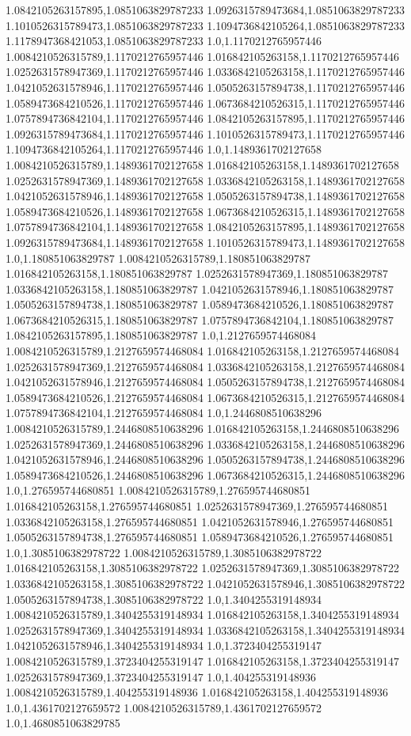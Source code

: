 1.0842105263157895,1.0851063829787233
1.0926315789473684,1.0851063829787233
1.1010526315789473,1.0851063829787233
1.1094736842105264,1.0851063829787233
1.1178947368421053,1.0851063829787233
1.0,1.1170212765957446
1.0084210526315789,1.1170212765957446
1.016842105263158,1.1170212765957446
1.0252631578947369,1.1170212765957446
1.0336842105263158,1.1170212765957446
1.0421052631578946,1.1170212765957446
1.0505263157894738,1.1170212765957446
1.0589473684210526,1.1170212765957446
1.0673684210526315,1.1170212765957446
1.0757894736842104,1.1170212765957446
1.0842105263157895,1.1170212765957446
1.0926315789473684,1.1170212765957446
1.1010526315789473,1.1170212765957446
1.1094736842105264,1.1170212765957446
1.0,1.1489361702127658
1.0084210526315789,1.1489361702127658
1.016842105263158,1.1489361702127658
1.0252631578947369,1.1489361702127658
1.0336842105263158,1.1489361702127658
1.0421052631578946,1.1489361702127658
1.0505263157894738,1.1489361702127658
1.0589473684210526,1.1489361702127658
1.0673684210526315,1.1489361702127658
1.0757894736842104,1.1489361702127658
1.0842105263157895,1.1489361702127658
1.0926315789473684,1.1489361702127658
1.1010526315789473,1.1489361702127658
1.0,1.180851063829787
1.0084210526315789,1.180851063829787
1.016842105263158,1.180851063829787
1.0252631578947369,1.180851063829787
1.0336842105263158,1.180851063829787
1.0421052631578946,1.180851063829787
1.0505263157894738,1.180851063829787
1.0589473684210526,1.180851063829787
1.0673684210526315,1.180851063829787
1.0757894736842104,1.180851063829787
1.0842105263157895,1.180851063829787
1.0,1.2127659574468084
1.0084210526315789,1.2127659574468084
1.016842105263158,1.2127659574468084
1.0252631578947369,1.2127659574468084
1.0336842105263158,1.2127659574468084
1.0421052631578946,1.2127659574468084
1.0505263157894738,1.2127659574468084
1.0589473684210526,1.2127659574468084
1.0673684210526315,1.2127659574468084
1.0757894736842104,1.2127659574468084
1.0,1.2446808510638296
1.0084210526315789,1.2446808510638296
1.016842105263158,1.2446808510638296
1.0252631578947369,1.2446808510638296
1.0336842105263158,1.2446808510638296
1.0421052631578946,1.2446808510638296
1.0505263157894738,1.2446808510638296
1.0589473684210526,1.2446808510638296
1.0673684210526315,1.2446808510638296
1.0,1.276595744680851
1.0084210526315789,1.276595744680851
1.016842105263158,1.276595744680851
1.0252631578947369,1.276595744680851
1.0336842105263158,1.276595744680851
1.0421052631578946,1.276595744680851
1.0505263157894738,1.276595744680851
1.0589473684210526,1.276595744680851
1.0,1.3085106382978722
1.0084210526315789,1.3085106382978722
1.016842105263158,1.3085106382978722
1.0252631578947369,1.3085106382978722
1.0336842105263158,1.3085106382978722
1.0421052631578946,1.3085106382978722
1.0505263157894738,1.3085106382978722
1.0,1.3404255319148934
1.0084210526315789,1.3404255319148934
1.016842105263158,1.3404255319148934
1.0252631578947369,1.3404255319148934
1.0336842105263158,1.3404255319148934
1.0421052631578946,1.3404255319148934
1.0,1.3723404255319147
1.0084210526315789,1.3723404255319147
1.016842105263158,1.3723404255319147
1.0252631578947369,1.3723404255319147
1.0,1.404255319148936
1.0084210526315789,1.404255319148936
1.016842105263158,1.404255319148936
1.0,1.4361702127659572
1.0084210526315789,1.4361702127659572
1.0,1.4680851063829785

